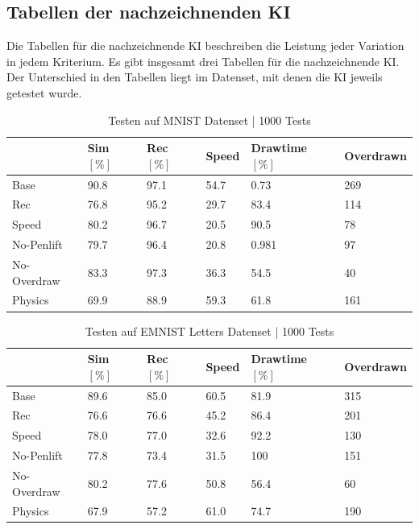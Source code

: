 \subsection{Tabellen der nachzeichnenden KI}\label{sub:r_tab_nachzeich}
Die Tabellen für die nachzeichnende KI beschreiben die Leistung jeder Variation
in jedem Kriterium. Es gibt insgesamt drei Tabellen für die nachzeichnende KI.
Der Unterschied in den Tabellen liegt im Datenset, mit denen die KI jeweils
getestet wurde.

\begin{table}[!ht]
    \centering
    \caption{Testen auf MNIST Datenset | 1000 Tests}\label{tab:MNIST}
    \begin{tabular}{|l|l|l|l|l|l|}
            \hline
            \hline ~ & Sim $[\%]$ & Rec $[\%]$ & Speed & Drawtime $[\%]$ & Overdrawn \\ \hline
            Base & 90.8 & 97.1 & 54.7 & 0.73 & 269 \\ \hline
            Rec & 76.8 & 95.2 & 29.7 & 83.4 & 114 \\ \hline
            Speed & 80.2 & 96.7 & 20.5 & 90.5 & 78 \\ \hline
            No-Penlift & 79.7 & 96.4 & 20.8 & 0.981 & 97 \\ \hline
            No-Overdraw & 83.3 & 97.3 & 36.3 & 54.5 & 40 \\ \hline
            Physics & 69.9 & 88.9 & 59.3 & 61.8 & 161 \\ \hline
        \end{tabular}
\end{table}

\begin{table}[!ht]
    \centering
    \caption{Testen auf EMNIST Letters Datenset | 1000 Tests}\label{tab:EMNIST}
    \begin{tabular}{|l|l|l|l|l|l|}
        \hline ~ & Sim $[\%]$ & Rec $[\%]$ & Speed & Drawtime $[\%]$ & Overdrawn \\ \hline
        Base & 89.6 & 85.0 & 60.5 & 81.9 & 315 \\ \hline
        Rec & 76.6 & 76.6 & 45.2 & 86.4 & 201 \\ \hline
        Speed & 78.0 & 77.0 & 32.6 & 92.2 & 130 \\ \hline
        No-Penlift & 77.8 & 73.4 & 31.5 & 100 & 151 \\ \hline
        No-Overdraw & 80.2 & 77.6 & 50.8 & 56.4 & 60 \\ \hline
        Physics & 67.9 & 57.2 & 61.0 & 74.7 & 190 \\ \hline
    \end{tabular}
\end{table}

